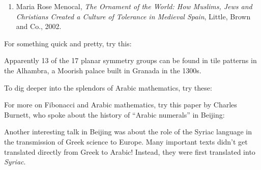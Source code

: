 \documentclass{article}
\def\tightlist{}
\renewcommand{\texttt}[1]{%
  \begingroup
  \ttfamily
  \begingroup\lccode`~=`/\lowercase{\endgroup\def~}{/\discretionary{}{}{}}%
  \begingroup\lccode`~=`[\lowercase{\endgroup\def~}{[\discretionary{}{}{}}%
  \begingroup\lccode`~=`.\lowercase{\endgroup\def~}{.\discretionary{}{}{}}%
  \catcode`/=\active\catcode`[=\active\catcode`.=\active
  \scantokens{#1\noexpand}%
  \endgroup
}
\begin{document}
\begin{enumerate}
\def\labelenumi{\arabic{enumi})}
\tightlist
\item
  Maria Rose Menocal, \emph{The Ornament of the World: How Muslims, Jews
  and Christians Created a Culture of Tolerance in Medieval Spain},
  Little, Brown and Co., 2002.
\end{enumerate}

For something quick and pretty, try this:


Apparently 13 of the 17 planar symmetry groups can be found in tile
patterns in the Alhambra, a Moorish palace built in Granada in the
1300s.

To dig deeper into the splendors of Arabic mathematics, try these:


For more on Fibonacci and Arabic mathematics, try this paper by Charles
Burnett, who spoke about the history of ``Arabic numerals'' in Beijing:


Another interesting talk in Beijing was about the role of the Syriac
language in the transmission of Greek science to Europe. Many important
texts didn't get translated directly from Greek to Arabic! Instead, they
were first translated into \emph{Syriac}.
\end{document}
